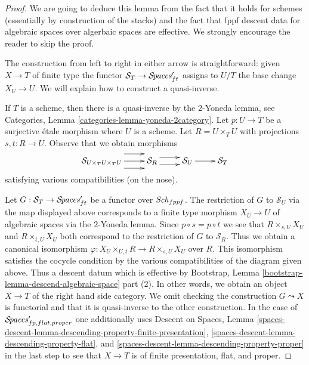\begin{proof}
We are going to deduce this lemma from the fact that it holds for schemes
(essentially by construction of the stacks) and the fact that fppf descent
data for algebraic spaces over algerbaic spaces are effective.
We strongly encourage the reader to skip the proof.

\medskip\noindent
The construction from left to right in either arrow is straightforward:
given $X \to T$ of finite type the functor
$\mathcal{S}_T \to  \mathcal{S}\!\mathit{paces}'_{ft}$ assigns to $U/T$ the
base change $X_U \to U$. We will explain how to construct a quasi-inverse.

\medskip\noindent
If $T$ is a scheme, then there is a quasi-inverse by the $2$-Yoneda lemma, see
Categories, Lemma \ref{categories-lemma-yoneda-2category}.
Let $p : U \to T$ be a surjective \'etale morphism where $U$ is a scheme.
Let $R = U \times_T U$ with projections $s, t : R \to U$.
Observe that we obtain morphisms
$$
\xymatrix{
\mathcal{S}_{U \times_T U \times_T U} \ar@<2ex>[r] \ar[r] \ar@<-2ex>[r] &
\mathcal{S}_R \ar@<1ex>[r] \ar@<-1ex>[r] &
\mathcal{S}_U \ar[r] &
\mathcal{S}_T
}
$$
satisfying various compatibilities (on the nose).

\medskip\noindent
Let $G : \mathcal{S}_T \to \mathcal{S}\!\mathit{paces}'_{ft}$ be a functor over $\mathit{Sch}_{fppf}$.
The restriction of $G$ to $\mathcal{S}_U$ via the map displayed above
corresponds to a finite type morphism $X_U \to U$ of algebraic spaces
via the $2$-Yoneda lemma. Since $p \circ s = p \circ t$ we see that
$R \times_{s, U} X_U$ and $R \times_{t, U} X_U$ both correspond to the
restriction of $G$ to $\mathcal{S}_R$. Thus we obtain a canonical isomorphism
$\varphi : X_U \times_{U, t} R \to R \times_{s, U} X_U$ over $R$.
This isomorphism satisfies the cocycle condition by the
various compatibilities of the diagram given above.
Thus a descent datum which is effective by Bootstrap, Lemma
\ref{bootstrap-lemma-descend-algebraic-space} part (2).
In other words, we obtain an object $X \to T$ of the right hand side
category. We omit checking the construction $G \leadsto X$
is functorial and that it is quasi-inverse to the other construction.
In the case of $\mathcal{S}\!\mathit{paces}'_{fp, flat, proper}$ one additionally uses
Descent on Spaces, Lemma
\ref{spaces-descent-lemma-descending-property-finite-presentation},
\ref{spaces-descent-lemma-descending-property-flat}, and
\ref{spaces-descent-lemma-descending-property-proper}
in the last step to see that $X \to T$ is of finite presentation,
flat, and proper.
\end{proof}

